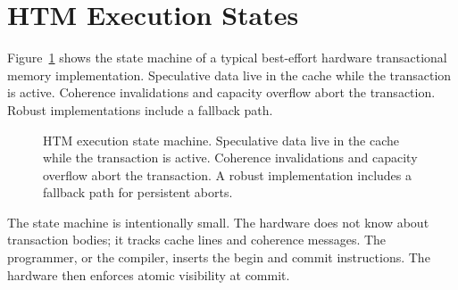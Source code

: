 \section{HTM Execution States}

Figure~\ref{fig:htm-state-machine} shows the state machine of a typical
best-effort hardware transactional memory implementation. Speculative data
live in the cache while the transaction is active. Coherence invalidations and
capacity overflow abort the transaction. Robust implementations include a
fallback path.

\begin{figure}[htbp]
\centering
{}
\caption{HTM execution state machine. Speculative data live in the cache
while the transaction is active. Coherence invalidations and capacity
overflow abort the transaction. A robust implementation includes a
fallback path for persistent aborts.}
\label{fig:htm-state-machine}
\end{figure}

The state machine is intentionally small. The hardware does not know about
transaction bodies; it tracks cache lines and coherence messages. The
programmer, or the compiler, inserts the begin and commit instructions. The
hardware then enforces atomic visibility at commit.

